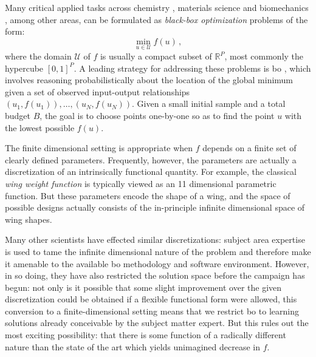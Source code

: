 \documentclass{article}
\newcommand{\R}{\mathbb{R}}
\newcommand{\U}{\mathcal{U}} %
\newcommand{\vu}{u}
\begin{document}
Many critical applied tasks across chemistry \citep{shields2021bayesian,wang2022bayesian}, materials science \citep{frazier2015materials,pedersen2021bayesian,todorovic2019bayesian} and biomechanics \cite{kim2026validation}, among other areas, can be formulated as \emph{black-box optimization} problems of the form:
\begin{equation}
    \min_{\vu \in \U}
    f(\vu) \,,
\end{equation}
where the domain $\U$ of $f$ is usually a compact subset of $\R^P$, most commonly the hypercube $[0,1]^P$.
A leading strategy for addressing these problems is \gls{bo} \citep{jones1998efficient,frazier2018tutorial,garnett2023bayesian}, which involves reasoning probabilistically about the location of the global minimum given a set of observed input-output relationships $(\vu_1,f(\vu_1)),\ldots,(\vu_N,f(\vu_N))$.
Given a small initial sample and a total budget $B$, the goal is to choose points one-by-one so as to find the point $\vu$ with the lowest possible $f(\vu)$.

The finite dimensional setting is appropriate when $f$ depends on a finite set of clearly defined parameters.
Frequently, however, the parameters are actually a discretization of an intrinsically functional quantity.
For example, the classical \textit{wing weight function} \cite[Ch.~1]{forrester2008} is typically viewed as an 11 dimensional parametric function. 
But these parameters encode the shape of a wing, and the space of possible designs actually consists of the in-principle infinite dimensional space of wing shapes.


Many other scientists have effected similar discretizations: subject area expertise is used to tame the infinite dimensional nature of the problem and therefore make it amenable to the available \gls{bo} methodology and software environment.
However, in so doing, they have also restricted the solution space before the campaign has begun: not only is it possible that some slight improvement over the given discretization could be obtained if a flexible functional form were allowed, this conversion to a finite-dimensional setting means that we restrict \gls{bo} to learning solutions already conceivable by the subject matter expert.
But this rules out the most exciting possibility: that there is some function of a radically different nature than the state of the art which yields unimagined decrease in $f$.
\end{document}
